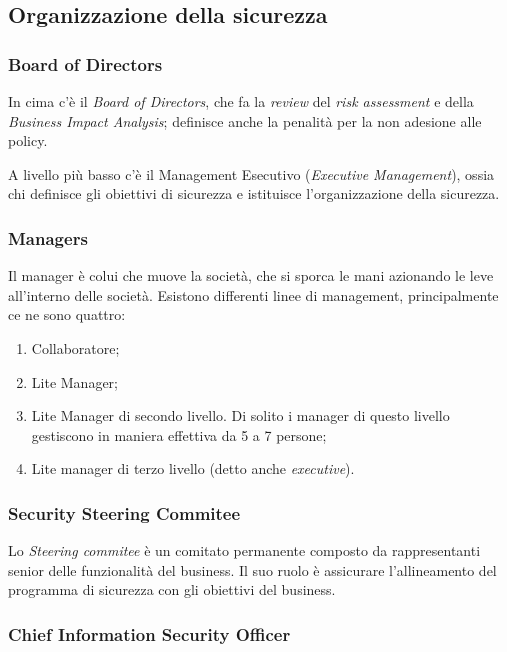\subsection{Organizzazione della sicurezza}

\subsubsection{Board of Directors}
In cima c'è il \textit{Board of Directors}, che fa la \textit{review} del
\textit{risk assessment} e della \textit{Business Impact Analysis}; definisce
anche la penalità per la non adesione alle policy.

A livello più basso c'è il Management Esecutivo (\textit{Executive Management}),
ossia chi definisce gli obiettivi di sicurezza e istituisce l'organizzazione
della sicurezza.

\subsubsection{Managers}

Il manager è colui che muove la società, che si sporca le mani azionando le leve
all'interno delle società.
Esistono differenti linee di management, principalmente ce ne sono quattro:
\begin{enumerate}
\item Collaboratore;
\item Lite Manager;
\item Lite Manager di secondo livello. Di solito i manager di questo livello
gestiscono in maniera effettiva da 5 a 7 persone;
\item Lite manager di terzo livello (detto anche \textit{executive}).
\end{enumerate}

\subsubsection{Security Steering Commitee}

Lo \textit{Steering commitee} è un comitato permanente composto da
rappresentanti senior delle funzionalità del business. Il suo ruolo è
assicurare l'allineamento del programma di sicurezza con gli obiettivi del
business.

\subsubsection{Chief Information Security Officer}

